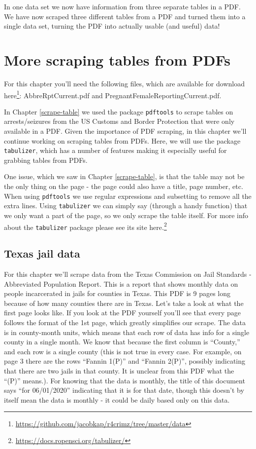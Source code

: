 \documentclass[
  a4paper,
]{krantz}
\renewcommand{\href}[2]{#2\footnote{\url{#1}}}
\begin{document}
In one data set we now have information from three separate
tables in a PDF. We have now scraped three different tables
from a PDF and turned them into a single data set, turning
the PDF into actually usable (and useful) data!

\hypertarget{scrape-table2}{%
\chapter{More scraping tables from
PDFs}\label{scrape-table2}}

For this chapter you'll need the following files, which are
available for download
\href{https://github.com/jacobkap/r4crimz/tree/master/data}{here}:
AbbreRptCurrent.pdf and PregnantFemaleReportingCurrent.pdf.

In Chapter \ref{scrape-table} we used the package
\texttt{pdftools} to scrape tables on arrests/seizures from
the US Customs and Border Protection that were only
available in a PDF. Given the importance of PDF scraping, in
this chapter we'll continue working on scraping tables from
PDFs. Here, we will use the package \texttt{tabulizer},
which has a number of features making it especially useful
for grabbing tables from PDFs.

One issue, which we saw in Chapter \ref{scrape-table}, is
that the table may not be the only thing on the page - the
page could also have a title, page number, etc. When using
\texttt{pdftools} we use regular expressions and subsetting
to remove all the extra lines. Using \texttt{tabulizer} we
can simply say (through a handy function) that we only want
a part of the page, so we only scrape the table itself. For
more info about the \texttt{tabulizer} package please see
its site \href{https://docs.ropensci.org/tabulizer/}{here.}

\hypertarget{texas-jail-data}{%
\section{Texas jail data}\label{texas-jail-data}}

For this chapter we'll scrape data from the Texas Commission
on Jail Standards - Abbreviated Population Report. This is a
report that shows monthly data on people incarcerated in
jails for counties in Texas. This PDF is 9 pages long
because of how many counties there are in Texas. Let's take
a look at what the first page looks like. If you look at the
PDF yourself you'll see that every page follows the format
of the 1st page, which greatly simplifies our scrape. The
data is in county-month units, which means that each row of
data has info for a single county in a single month. We know
that because the first column is ``County,'' and each row is
a single county (this is not true in every case. For
example, on page 3 there are the rows ``Fannin 1(P)'' and
``Fannin 2(P)'', possibly indicating that there are two
jails in that county. It is unclear from this PDF what the
``(P)'' means.). For knowing that the data is monthly, the
title of this document says ``for 06/01/2020'' indicating
that it is for that date, though this doesn't by itself mean
the data is monthly - it could be daily based only on this
data.
\end{document}
